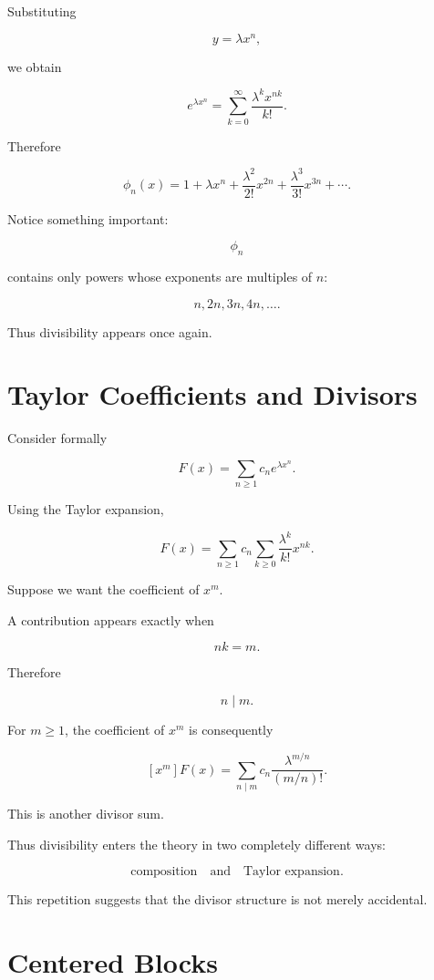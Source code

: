 Substituting

\[
y=\lambda x^n,
\]

we obtain

\[
e^{\lambda x^n}
=
\sum_{k=0}^{\infty}
\frac{\lambda^k x^{nk}}{k!}.
\]

Therefore

\[
\boxed{
\phi_n(x)
=
1
+
\lambda x^n
+
\frac{\lambda^2}{2!}x^{2n}
+
\frac{\lambda^3}{3!}x^{3n}
+\cdots.
}
\]

Notice something important:

\[
\phi_n
\]

contains only powers whose exponents are multiples of \(n\):

\[
n,2n,3n,4n,\ldots.
\]

Thus divisibility appears once again.

\section{Taylor Coefficients and Divisors}

Consider formally

\[
F(x)
=
\sum_{n\geq1}c_ne^{\lambda x^n}.
\]

Using the Taylor expansion,

\[
F(x)
=
\sum_{n\geq1}
c_n
\sum_{k\geq0}
\frac{\lambda^k}{k!}x^{nk}.
\]

Suppose we want the coefficient of \(x^m\).

A contribution appears exactly when

\[
nk=m.
\]

Therefore

\[
n\mid m.
\]

For \(m\geq1\), the coefficient of \(x^m\) is consequently

\[
\boxed{
[x^m]F(x)
=
\sum_{n\mid m}
c_n
\frac{\lambda^{m/n}}{(m/n)!}.
}
\]

This is another divisor sum.

Thus divisibility enters the theory in two completely different ways:

\[
\text{composition}
\quad\text{and}\quad
\text{Taylor expansion}.
\]

This repetition suggests that the divisor structure is not merely
accidental.

\section{Centered Blocks}

